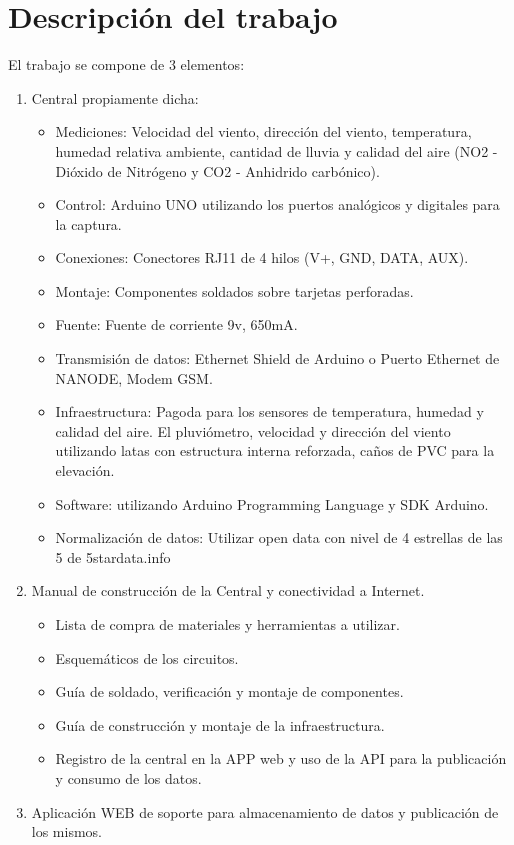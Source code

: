 \documentclass[a4paper,11pt, spanish]{article}
\begin{document}
\section{Descripción del trabajo}
El trabajo se compone de 3 elementos:
\begin{enumerate}
\item Central propiamente dicha:
\begin{itemize}
\item Mediciones: Velocidad del viento, dirección del viento, temperatura, humedad relativa ambiente, cantidad de lluvia y calidad del aire (NO2 - Dióxido de Nitrógeno y CO2 - Anhidrido carbónico).
\item Control: Arduino UNO utilizando los puertos analógicos y digitales para la captura.
\item Conexiones: Conectores RJ11 de 4 hilos (V+, GND, DATA, AUX).
\item Montaje: Componentes soldados sobre tarjetas perforadas.
\item Fuente: Fuente de corriente 9v, 650mA.
\item Transmisión de datos: Ethernet Shield de Arduino o Puerto Ethernet de NANODE, Modem GSM.
\item Infraestructura: Pagoda para los sensores de temperatura, humedad y calidad del aire. El pluviómetro, velocidad y dirección del viento utilizando latas con estructura interna reforzada, caños de PVC para la elevación.
\item Software: utilizando Arduino Programming Language y SDK Arduino.
\item Normalización de datos: Utilizar open data con nivel de 4 estrellas de las 5 de 5stardata.info
\end{itemize}
\item Manual de construcción de la Central y conectividad a Internet.
\begin{itemize}
\item Lista de compra de materiales y herramientas a utilizar.
\item Esquemáticos de los circuitos.
\item Guía de soldado, verificación y montaje de componentes.
\item Guía de construcción y montaje de la infraestructura.
\item Registro de la central en la APP web y uso de la API para la publicación y consumo de los datos.
\end{itemize}
\item Aplicación WEB de soporte para almacenamiento de datos y publicación de los mismos.

\end{enumerate}
\end{document}
